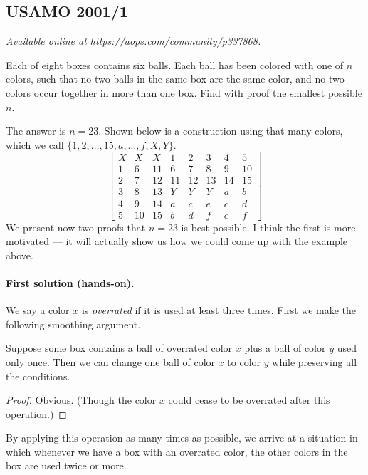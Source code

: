 \documentclass[11pt]{scrartcl}
\begin{document}
\subsection{USAMO 2001/1}
\textsl{Available online at \url{https://aops.com/community/p337868}.}
\begin{mdframed}[style=mdpurplebox,frametitle={Problem statement}]
Each of eight boxes contains six balls.
Each ball has been colored with one of $n$ colors,
such that no two balls in the same box are the same color,
and no two colors occur together in more than one box.
Find with proof the smallest possible $n$.
\end{mdframed}
The answer is $n = 23$.
Shown below is a construction using that many colors,
which we call $\{1,2,\dots,15,a,\dots,f,X,Y\}$.
\[
  \begin{bmatrix}
    X & X & X & 1 & 2 & 3 & 4 & 5 \\
    1 & 6 & 11 & 6 & 7 & 8 & 9 & 10 \\
    2 & 7 & 12 & 11 & 12 & 13 & 14 & 15 \\
    3 & 8 & 13 & Y & Y & Y & a & b \\
    4 & 9 & 14 & a & c & e & c & d \\
    5 & 10 & 15 & b & d & f & e & f
  \end{bmatrix}
\]
We present now two proofs that $n = 23$ is best possible.
I think the first is more motivated --- it will
actually show us how we could come up with the example above.

\paragraph{First solution (hands-on).}
We say a color $x$ is \emph{overrated}
if it is used at least three times.
First we make the following smoothing argument.
\begin{claim*}
  Suppose some box contains a ball of overrated color $x$
  plus a ball of color $y$ used only once.
  Then we can change one ball of color $x$ to color $y$
  while preserving all the conditions.
\end{claim*}
\begin{proof}
  Obvious.
  (Though the color $x$ could cease to be overrated after this operation.)
\end{proof}
By applying this operation as many times as possible,
we arrive at a situation in which whenever we have
a box with an overrated color,
the other colors in the box are used twice or more.
\end{document}
